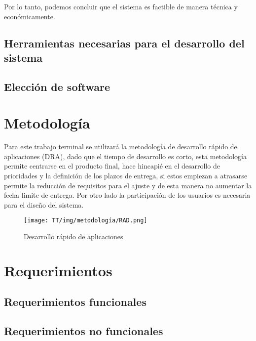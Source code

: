 Por lo tanto, podemos concluir que el sistema es factible de manera técnica y económicamente.
\subsection{Herramientas necesarias para el desarrollo del sistema}

\subsection{Elección de software}

\section{Metodología}
Para este trabajo terminal se utilizará la metodología de desarrollo rápido de aplicaciones (DRA), dado que el tiempo de desarrollo es corto, esta metodología permite centrarse en el producto final, hace hincapié en el desarrollo de prioridades y la definición de los plazos de entrega, si estos empiezan a atrasarse permite la reducción de requisitos para el ajuste y de esta manera no aumentar la fecha limite de entrega. Por otro lado la participación de los usuarios es necesaria para el diseño del sistema.\cite{dra}

\begin{figure}[!ht]
    \centering
    \texttt{[image: TT/img/metodología/RAD.png]}
    \caption{Desarrollo rápido de aplicaciones}
    \label{graphic:RAD}
\end{figure}
\section{Requerimientos}

\subsection{Requerimientos funcionales}

\subsection{Requerimientos no funcionales}

